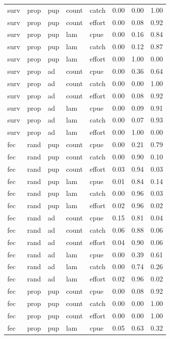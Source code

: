 \documentclass[11pt]{article}
\begin{document}
\begin{longtable}{lllllrrr}
  surv & prop & pup & count & catch & 0.00 & 0.00 & 1.00 \\
  surv & prop & pup & count & effort & 0.00 & 0.08 & 0.92 \\
  surv & prop & pup & lam & cpue & 0.00 & 0.16 & 0.84 \\
  surv & prop & pup & lam & catch & 0.00 & 0.12 & 0.87 \\
  surv & prop & pup & lam & effort & 0.00 & 1.00 & 0.00 \\
  surv & prop & ad & count & cpue & 0.00 & 0.36 & 0.64 \\
  surv & prop & ad & count & catch & 0.00 & 0.00 & 1.00 \\
  surv & prop & ad & count & effort & 0.00 & 0.08 & 0.92 \\
  surv & prop & ad & lam & cpue & 0.00 & 0.09 & 0.91 \\
  surv & prop & ad & lam & catch & 0.00 & 0.07 & 0.93 \\
  surv & prop & ad & lam & effort & 0.00 & 1.00 & 0.00 \\
  fec & rand & pup & count & cpue & 0.00 & 0.21 & 0.79 \\
  fec & rand & pup & count & catch & 0.00 & 0.90 & 0.10 \\
  fec & rand & pup & count & effort & 0.03 & 0.94 & 0.03 \\
  fec & rand & pup & lam & cpue & 0.01 & 0.84 & 0.14 \\
  fec & rand & pup & lam & catch & 0.00 & 0.96 & 0.03 \\
  fec & rand & pup & lam & effort & 0.02 & 0.96 & 0.02 \\
  fec & rand & ad & count & cpue & 0.15 & 0.81 & 0.04 \\
  fec & rand & ad & count & catch & 0.06 & 0.88 & 0.06 \\
  fec & rand & ad & count & effort & 0.04 & 0.90 & 0.06 \\
  fec & rand & ad & lam & cpue & 0.00 & 0.39 & 0.61 \\
  fec & rand & ad & lam & catch & 0.00 & 0.74 & 0.26 \\
  fec & rand & ad & lam & effort & 0.02 & 0.96 & 0.02 \\
  fec & prop & pup & count & cpue & 0.00 & 0.08 & 0.92 \\
  fec & prop & pup & count & catch & 0.00 & 0.00 & 1.00 \\
  fec & prop & pup & count & effort & 0.00 & 0.00 & 1.00 \\
  fec & prop & pup & lam & cpue & 0.05 & 0.63 & 0.32 \\

\end{longtable}
\end{document}
